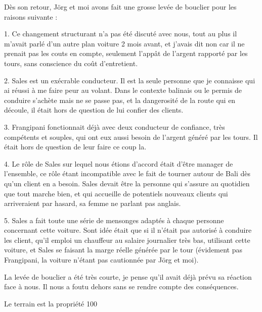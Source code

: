 Dès son retour, Jörg et moi avons fait une grosse levée de bouclier pour les raisons suivante :

1. Ce changement structurant n’a pas été discuté avec nous, tout au plus il m’avait parlé d’un autre plan voiture 2 mois avant, et j’avais dit non car il ne prenait pas les couts en compte, seulement l’appât de l’argent rapporté par les tours, sans conscience du coût d’entretient.

2. Sales est un exécrable conducteur. Il est la seule personne que je connaisse qui ai réussi à me faire peur au volant. Dans le contexte balinais ou le permis de conduire s’achète mais ne se passe pas, et la dangerosité de la route qui en découle, il était hors de question de lui confier des clients.

3. Frangipani fonctionnait déjà avec deux conducteur de confiance, très compétents et souples, qui ont eux aussi besoin de l’argent généré par les tours. Il était hors de question de leur faire ce coup la.

4. Le rôle de Sales sur lequel nous étions d’accord était d’être manager de l’ensemble, ce rôle étant incompatible avec le fait de tourner autour de Bali dès qu’un client en a besoin. Sales devait être la personne qui s’assure au quotidien que tout marche bien, et qui accueille de potentiels nouveaux clients qui arriveraient par hasard, sa femme ne parlant pas anglais.

5. Sales a fait toute une série de mensonges adaptés à chaque personne concernant cette voiture. Sont idée était que si il n’était pas autorisé à conduire les client, qu’il emploi un chauffeur au salaire journalier très bas, utilisant cette voiture, et Sales se faisant la marge réelle générée par le tour (évidement pas Frangipani, la voiture n’étant pas cautionnée par Jörg et moi).

La levée de bouclier a été très courte, je pense qu’il avait déjà prévu sa réaction face à nous. Il nous a foutu dehors sans se rendre compte des conséquences.

Le terrain est la propriété 100%

